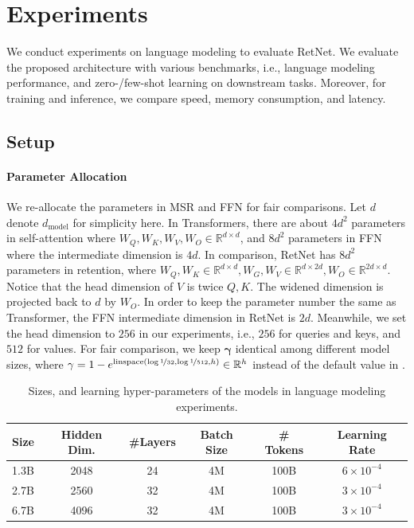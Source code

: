\documentclass{article}
\newcommand\our{RetNet}
\begin{document}
\section{Experiments}
\label{sec:exp}

We conduct experiments on language modeling to evaluate \our{}.
We evaluate the proposed architecture with various benchmarks, i.e., language modeling performance, and zero-/few-shot learning on downstream tasks.
Moreover, for training and inference, we compare speed, memory consumption, and latency.

\subsection{Setup}
\label{sec:setup}

\paragraph{Parameter Allocation}
We re-allocate the parameters in MSR and FFN for fair comparisons.
Let $d$ denote $d_\text{model}$ for simplicity here.
In Transformers, there are about $4d^2$ parameters in self-attention where $W_Q, W_K, W_V, W_O\in\mathbb{R}^{d\times d}$, and $8d^2$ parameters in FFN where the intermediate dimension is $4d$.
In comparison, \our{} has $8d^2$ parameters in retention, where $W_Q, W_K\in\mathbb{R}^{d\times d}, W_G,W_V\in\mathbb{R}^{d\times 2d}, W_O\in\mathbb{R}^{2d\times d}$.
Notice that the head dimension of $V$ is twice $Q, K$. The widened dimension is projected back to $d$ by $W_O$.
In order to keep the parameter number the same as Transformer, the FFN intermediate dimension in \our{} is $2d$.
Meanwhile, we set the head dimension to $256$ in our experiments, i.e., $256$ for queries and keys, and $512$ for values.
For fair comparison, we keep $\mathbf{\gamma}$ identical among different model sizes, where $\mathbf{\gamma} = 1 - e^{\mathrm{linspace}(\log\nicefrac{1}{32}, \log\nicefrac{1}{512}, h)} \in \mathbb{R}^{h}$ instead of the default value in .

\begin{table}[t]
\centering
\captionsetup{type=table}
\begin{tabular}{cccccc}
\toprule
\bf Size & \bf Hidden Dim. & \bf \#Layers & \bf Batch Size & \bf \# Tokens & \bf Learning Rate \\
\midrule
1.3B & 2048 & 24 & 4M & 100B & $6\times10^{-4}$ \\
2.7B & 2560 & 32 & 4M & 100B & $3\times10^{-4}$ \\
6.7B & 4096 & 32 & 4M & 100B & $3\times10^{-4}$ \\
\bottomrule
\end{tabular}
\caption{Sizes, and learning hyper-parameters of the models in language modeling experiments.}
\label{tbl:size}
\end{table}
\end{document}
